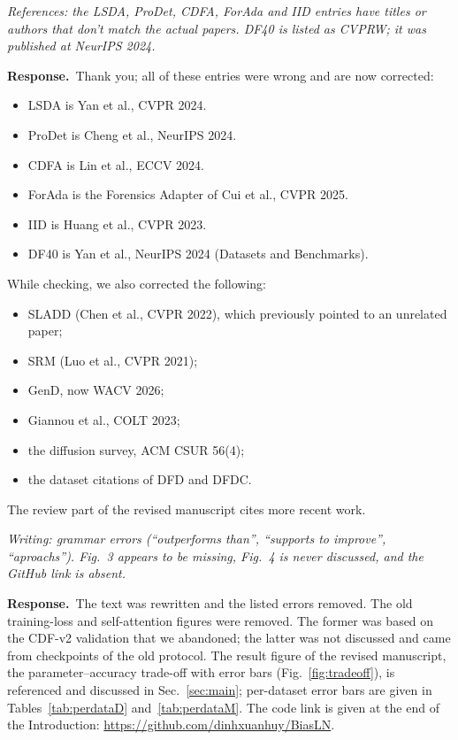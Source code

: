 \documentclass[11pt]{article}
\newenvironment{comment}{\par\medskip\noindent\begin{minipage}{\linewidth}\color{black!70}\itshape}{\end{minipage}\par\smallskip}
\newcommand{\resp}{\noindent\textbf{Response.}~}
\begin{document}
\begin{comment}
References: the LSDA, ProDet, CDFA, ForAda and IID entries have titles or authors that don't match the actual papers. DF40 is listed as CVPRW; it was published at NeurIPS 2024.
\end{comment}
\resp Thank you; all of these entries were wrong and are now corrected:
\begin{itemize}
\item LSDA is Yan et al., CVPR 2024.
\item ProDet is Cheng et al., NeurIPS 2024.
\item CDFA is Lin et al., ECCV 2024.
\item ForAda is the Forensics Adapter of Cui et al., CVPR 2025.
\item IID is Huang et al., CVPR 2023.
\item DF40 is Yan et al., NeurIPS 2024 (Datasets and Benchmarks).
\end{itemize}
While checking, we also corrected the following:
\begin{itemize}
\item SLADD (Chen et al., CVPR 2022), which previously pointed to an unrelated paper;
\item SRM (Luo et al., CVPR 2021);
\item GenD, now WACV 2026;
\item Giannou et al., COLT 2023;
\item the diffusion survey, ACM CSUR 56(4);
\item the dataset citations of DFD and DFDC.
\end{itemize}
The review part of the revised manuscript cites more recent work.

\begin{comment}
Writing: grammar errors (``outperforms than'', ``supports to improve'', ``aproachs''). Fig.~3 appears to be missing, Fig.~4 is never discussed, and the GitHub link is absent.
\end{comment}
\resp The text was rewritten and the listed errors removed. The old training-loss and self-attention figures were removed. The former was based on the CDF-v2 validation that we abandoned; the latter was not discussed and came from checkpoints of the old protocol. The result figure of the revised manuscript, the parameter--accuracy trade-off with error bars (Fig.~\ref{fig:tradeoff}), is referenced and discussed in Sec.~\ref{sec:main}; per-dataset error bars are given in Tables~\ref{tab:perdataD} and~\ref{tab:perdataM}. The code link is given at the end of the Introduction: \url{https://github.com/dinhxuanhuy/BiasLN}.
\end{document}
